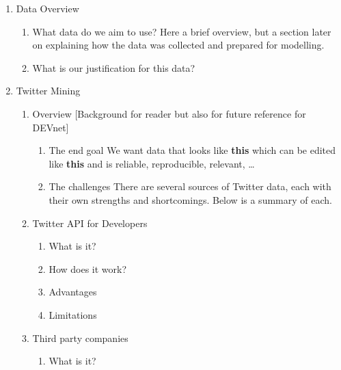 \documentclass{article}
\begin{document}
\begin{enumerate}
\item Data Overview
\label{sec-2-1}

\begin{enumerate}
\item What data do we aim to use? Here a brief overview, but a section later on explaining how the data was collected and prepared for modelling.
\label{sec-2-1-1}

\item What is our justification for this data?
\label{sec-2-1-2}
\end{enumerate}


\item Twitter Mining
\label{sec-2-2}

\begin{enumerate}
\item Overview [Background for reader but also for future reference for DEVnet]
\label{sec-2-2-1}

\begin{enumerate}
\item The end goal
\label{sec-2-2-1-1}
We want data that looks like \textbf{this} which can be edited like \textbf{this} and is reliable, reproducible, relevant, \ldots{}
\item The challenges
\label{sec-2-2-1-2}
There are several sources of Twitter data, each with their own strengths and shortcomings. Below is a summary of each.
\end{enumerate}

\item Twitter API for Developers
\label{sec-2-2-2}

\begin{enumerate}
\item What is it?
\label{sec-2-2-2-1}

\item How does it work?
\label{sec-2-2-2-2}

\item Advantages
\label{sec-2-2-2-3}

\item Limitations
\label{sec-2-2-2-4}
\end{enumerate}

\item Third party companies
\label{sec-2-2-3}

\begin{enumerate}
\item What is it?
\label{sec-2-2-3-1}


\end{enumerate}
\end{enumerate}
\end{enumerate}
\end{document}
